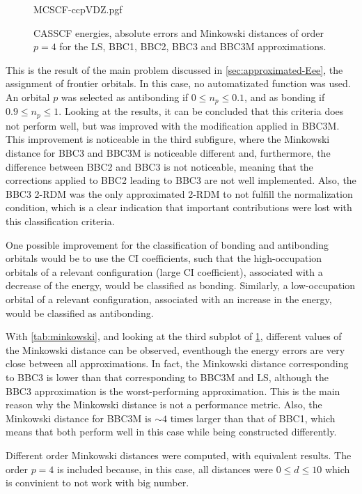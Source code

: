     \begin{figure}[tb!]
        \centering
        {MCSCF-ccpVDZ.pgf}
        \caption{CASSCF energies, absolute errors and Minkowski distances of order 
        $p=4$ for the LS, BBC1, BBC2, BBC3 and BBC3M approximations.}
        \label{fig:plot_pdf}
    \end{figure}

    This is the result of the main problem discussed in \cref{sec:approximated-Eee},
    the assignment of frontier orbitals.
    In this case, no automatizated function was used.
    An orbital $p$ was selected as antibonding if $0 \le n_p \le 0.1$, and as
    bonding if $0.9 \le n_p \le 1$.
    Looking at the results, it can be concluded that this criteria does not perform
    well, but was improved with the modification applied in BBC3M.
    This improvement is noticeable in the third subfigure, where the Minkowski distance
    for BBC3 and BBC3M is noticeable different and, furthermore, the difference
    between BBC2 and BBC3 is not noticeable, meaning that the corrections
    applied to BBC2 leading to BBC3 are not well implemented.
    Also, the BBC3 2-RDM was the only approximated 2-RDM to not fulfill the normalization
    condition, which is a clear indication that important contributions were lost
    with this classification criteria.

    One possible improvement for the classification of bonding and antibonding
    orbitals would be to use the CI coefficients, such that the high-occupation
    orbitals of a relevant configuration (large CI coefficient), associated with
    a decrease of the energy, would be classified as bonding.
    Similarly, a low-occupation orbital of a relevant configuration, associated
    with an increase in the energy, would be classified as antibonding.

    With \cref{tab:minkowski}, and looking at the third subplot of \cref{fig:plot_pdf},
    different values of the Minkowski distance can be observed, eventhough the
    energy errors are very close between all approximations.
    In fact, the Minkowski distance corresponding to BBC3 is lower than that
    corresponding to BBC3M and LS, although the BBC3 approximation is the worst-performing
    approximation.
    This is the main reason why the Minkowski distance is not a performance metric.
    Also, the Minkowski distance for BBC3M is $\sim 4$ times larger than that of
    BBC1, which means that both perform well in this case while being constructed
    differently.

    Different order Minkowski distances were computed, with equivalent results.
    The order $p=4$ is included because, in this case, all distances were
    $0 \le d \le 10$ which is convinient to not work with big number.
